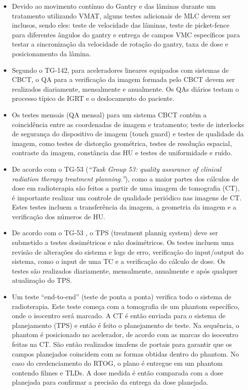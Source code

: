 \documentclass[11pt,a4paper]{article}
\newcounter{exemplo}
\begin{document}
\begin{exemplo}[11. Qualidade ]
\begin{itemize}
        \item Devido ao movimento contínuo do Gantry e das lâminas durante um tratamento utilizando VMAT, alguns testes adicionais de MLC devem ser inclusos, sendo eles: teste de velocidade das lâminas, teste de picket-fence para diferentes ângulos do gantry e entrega de campos VMC específicos para testar a sincronização da velocidade de rotação do gantry, taxa de dose e posicionamento da lâmina.

        \item Segundo o TG-142, para aceleradores lineares equipados com sistemas de CBCT, o QA para a verificação da imagem formada pelo CBCT devem ser realizados diariamente, mensalmente e anualmente. Os QAs diários testam o processo típico de IGRT e o deslocamento do paciente.
        
        \item Os testes mensais (QA mensal) para um sistema CBCT contém a coincidência entre as coordenadas de imagem e tratamento; teste de interlocks de segurança do dispositivo de imagem (touch guard) e testes de qualidade da imagem, como testes de distorção geométrica, testes de resolução espacial, contraste da imagem, constância das HU e testes de uniformidade e ruído.
        
        \item De acordo com o TG-53 (\textit{``Task Group 53: quality assurance of clinical radiation therapy treatment planning.''}), como a maior partes dos cálculos de dose em radioterapia são feitos a partir de uma imagem de tomografia (CT), é importante realizar um controle de qualidade periódico nas imagens de CT. Estes testes incluem a transferência da imagem, a geometria da imagem e a verificação dos números de HU.
        
        \item De acordo com o TG-53 , o TPS (treatment plannig system) deve ser submetido a testes dosimétricos e não dosimétricos. Os testes incluem uma revisão de alterações do sistema e  logs de erro, verificação do input/output do sistema, como o input de uma TC e a verificação do cálculo de dose. Os testes são realizados diariamente, mensalmente, anualmente e após qualquer atualização do TPS.  
        
        \item Um teste ``end-to-end'' (teste de ponta a ponta) verifica todo o sistema de radioterapia. Este teste começa com a tomografia de um phantom específico, onde o isocentro será marcado. A CT é então enviada para o sistema de planejamento (TPS) e então é feito o planejamento de teste. Na sequência, o phantom é posicionado no acelerador, de acordo com as marcas do isocentro feitas na CT. São então realizados imafens de portais para garantir que os campos planejados coincidem com as formas obtidas dentro do phantom. No caso do credenciamento do RTOG, o plano é entregue em um phantom contendo filmes e TLDs. A dose medida é então comparada com a dose planejada para confirmar a precisão da entrega da dose planejada.
        

\end{itemize}
\end{exemplo}
\end{document}
